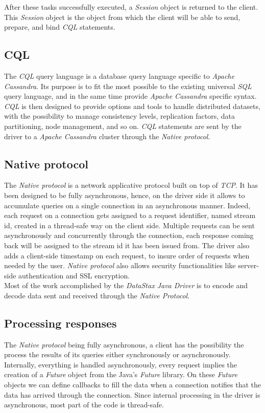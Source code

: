 \documentclass[a4paper]{report}
\newcommand{\djd}{\emph{DataStax Java Driver\xspace}}
\newcommand{\ca}{\emph{Apache Cassandra\xspace}}
\begin{document}
After these tasks successfully executed, a \emph{Session} object is returned to the client. This \emph{Session} object is the object from which the client will be able to send, prepare, and bind \emph{CQL} statements.

\subsection{CQL}
The \emph{CQL} query language is a database query language specific to \ca{}. Its purpose is to fit the most possible to the existing universal \emph{SQL} query language, and in the same time provide \ca{} specific syntax. \emph{CQL} is then designed to provide options and tools to handle distributed datasets, with the possibility to manage consistency levels, replication factors, data partitioning, node management, and so on. \emph{CQL} statements are sent by the driver to a \ca{} cluster through the \emph{Native protocol}.

\subsection{Native protocol}
The \emph{Native protocol} is a network applicative protocol built on top of \emph{TCP}. It has been designed to be fully asynchronous, hence, on the driver side it allows to accumulate queries on a single connection in an asynchronous manner. Indeed, each request on a connection gets assigned to a request identifier, named stream id, created in a thread-safe way on the client side. Multiple requests can be sent asynchronously and concurrently through the connection, each response coming back will be assigned to the stream id it has been issued from. The driver also adds a client-side timestamp on each request, to insure order of requests when needed by the user.
\emph{Native protocol} also allows security functionalities like server-side authentication and SSL encryption.\\
Most of the work accomplished by the \djd{} is to encode and decode data sent and received through the \emph{Native Protocol}.

\subsection{Processing responses}
The \emph{Native protocol} being fully asynchronous, a client has the possibility the process the results of its queries either synchronously or asynchronously. Internally, everything is handled asynchronously, every request implies the creation of a \emph{Future} object from the Java's \emph{Future} library. On these \emph{Future} objects we can define callbacks to fill the data when a connection notifies that the data has arrived through the connection. Since internal processing in the driver is asynchronous, most part of the code is thread-safe.
\end{document}
